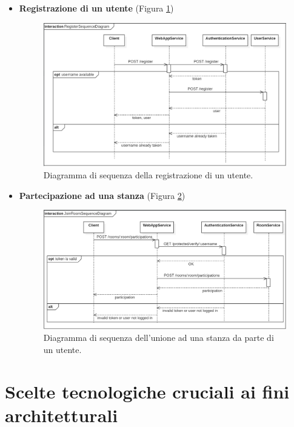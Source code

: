 \begin{itemize}
    \item \textbf{Registrazione di un utente} (Figura  \ref{fig:registration-sequence-diagram})
        \begin{figure}
           \centering \includegraphics[width=\linewidth]{images/RegistrationSequenceDiagram.PNG}
            \caption{Diagramma di sequenza della registrazione di un utente.}
            \label{fig:registration-sequence-diagram}
        \end{figure}
        
    \item \textbf{Partecipazione ad una stanza} (Figura \ref{fig:join-room-sequence-diagram})
        \begin{figure}
           \centering \includegraphics[width=\linewidth]{images/JoinRoomSequenceDiagram.PNG}
            \caption{Diagramma di sequenza dell'unione ad una stanza da parte di un utente.}
            \label{fig:join-room-sequence-diagram}
        \end{figure}
\end{itemize}


\section{Scelte tecnologiche cruciali ai fini architetturali}
